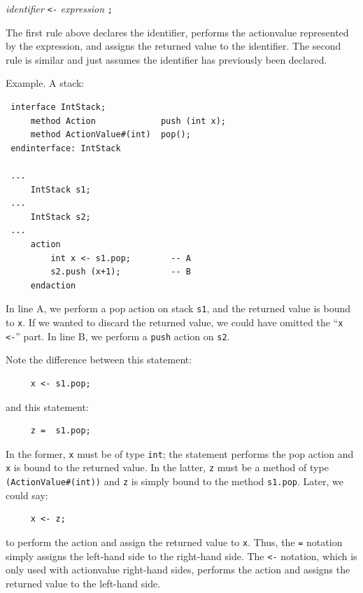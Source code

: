 \documentclass[twoside,letterpaper]{article}
\newcommand{\hm}{\hspace*{1em}}
\newcommand{\nterm}[1]{\emph{#1}}
\newcommand{\term}[1]{\texttt{#1}}
\newcommand{\gram}[2]{    \hm\makebox[10em][l]{\it #1}\makebox[1.5em][l]{::=}    #2}
\begin{document}
\gram{varDo}{ \nterm{identifier} \term{<-} \nterm{expression} \term{;} }

The first rule above declares the identifier, performs the actionvalue
represented by the expression, and assigns the returned value to the
identifier.  The second rule is similar and just assumes the
identifier has previously been declared.

Example. A stack:
\begin{verbatim}
 interface IntStack;
     method Action             push (int x);
     method ActionValue#(int)  pop();
 endinterface: IntStack

 ...
     IntStack s1;
 ...
     IntStack s2;
 ...
     action
         int x <- s1.pop;        -- A
         s2.push (x+1);          -- B
     endaction
\end{verbatim}
In line A, we perform a pop action on stack \texttt{s1}, and the returned
value is bound to \texttt{x}.  If we wanted to discard the returned
value, we could have omitted the ``\texttt{x <-}'' part.  In line B, we
perform a \texttt{push} action on \texttt{s2}.

Note the difference between this statement:
\begin{verbatim}
     x <- s1.pop;
\end{verbatim}
and this statement:
\begin{verbatim}
     z =  s1.pop;
\end{verbatim}
In the former, \texttt{x} must be of type \texttt{int}; the statement
performs the pop action and \texttt{x} is bound to the returned value.
In the latter, \texttt{z} must be a method of type {\tt(ActionValue\#(int))} and \texttt{z} is simply bound to the
method \texttt{s1.pop}.  Later, we could say:
\begin{verbatim}
     x <- z;
\end{verbatim}
to perform the action and assign the returned value to \texttt{x}.  Thus,
the \texttt{=} notation simply assigns the left-hand side to the right-hand
side.  The \texttt{<-} notation, which is only used with actionvalue
right-hand sides, performs the action and assigns the returned value to
the left-hand side.
\end{document}
